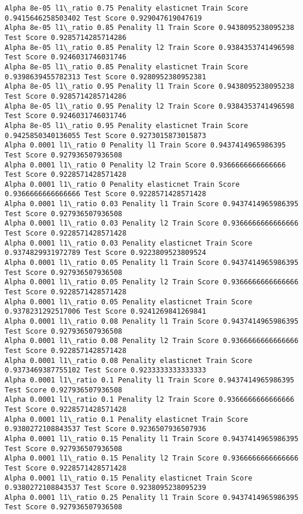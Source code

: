 \documentclass[11pt]{article}
\begin{document}
\begin{Verbatim}[commandchars=\\\{\}]
Alpha 8e-05 l1\_ratio 0.75 Penality elasticnet Train Score 0.9415646258503402 Test Score 0.929047619047619
Alpha 8e-05 l1\_ratio 0.85 Penality l1 Train Score 0.9438095238095238 Test Score 0.9285714285714286
Alpha 8e-05 l1\_ratio 0.85 Penality l2 Train Score 0.9384353741496598 Test Score 0.9246031746031746
Alpha 8e-05 l1\_ratio 0.85 Penality elasticnet Train Score 0.9398639455782313 Test Score 0.9280952380952381
Alpha 8e-05 l1\_ratio 0.95 Penality l1 Train Score 0.9438095238095238 Test Score 0.9285714285714286
Alpha 8e-05 l1\_ratio 0.95 Penality l2 Train Score 0.9384353741496598 Test Score 0.9246031746031746
Alpha 8e-05 l1\_ratio 0.95 Penality elasticnet Train Score 0.9425850340136055 Test Score 0.9273015873015873
Alpha 0.0001 l1\_ratio 0 Penality l1 Train Score 0.9437414965986395 Test Score 0.927936507936508
Alpha 0.0001 l1\_ratio 0 Penality l2 Train Score 0.9366666666666666 Test Score 0.9228571428571428
Alpha 0.0001 l1\_ratio 0 Penality elasticnet Train Score 0.9366666666666666 Test Score 0.9228571428571428
Alpha 0.0001 l1\_ratio 0.03 Penality l1 Train Score 0.9437414965986395 Test Score 0.927936507936508
Alpha 0.0001 l1\_ratio 0.03 Penality l2 Train Score 0.9366666666666666 Test Score 0.9228571428571428
Alpha 0.0001 l1\_ratio 0.03 Penality elasticnet Train Score 0.9374829931972789 Test Score 0.9223809523809524
Alpha 0.0001 l1\_ratio 0.05 Penality l1 Train Score 0.9437414965986395 Test Score 0.927936507936508
Alpha 0.0001 l1\_ratio 0.05 Penality l2 Train Score 0.9366666666666666 Test Score 0.9228571428571428
Alpha 0.0001 l1\_ratio 0.05 Penality elasticnet Train Score 0.9378231292517006 Test Score 0.9241269841269841
Alpha 0.0001 l1\_ratio 0.08 Penality l1 Train Score 0.9437414965986395 Test Score 0.927936507936508
Alpha 0.0001 l1\_ratio 0.08 Penality l2 Train Score 0.9366666666666666 Test Score 0.9228571428571428
Alpha 0.0001 l1\_ratio 0.08 Penality elasticnet Train Score 0.9373469387755102 Test Score 0.9233333333333333
Alpha 0.0001 l1\_ratio 0.1 Penality l1 Train Score 0.9437414965986395 Test Score 0.927936507936508
Alpha 0.0001 l1\_ratio 0.1 Penality l2 Train Score 0.9366666666666666 Test Score 0.9228571428571428
Alpha 0.0001 l1\_ratio 0.1 Penality elasticnet Train Score 0.9380272108843537 Test Score 0.9236507936507936
Alpha 0.0001 l1\_ratio 0.15 Penality l1 Train Score 0.9437414965986395 Test Score 0.927936507936508
Alpha 0.0001 l1\_ratio 0.15 Penality l2 Train Score 0.9366666666666666 Test Score 0.9228571428571428
Alpha 0.0001 l1\_ratio 0.15 Penality elasticnet Train Score 0.9380272108843537 Test Score 0.9238095238095239
Alpha 0.0001 l1\_ratio 0.25 Penality l1 Train Score 0.9437414965986395 Test Score 0.927936507936508

\end{Verbatim}
\end{document}
